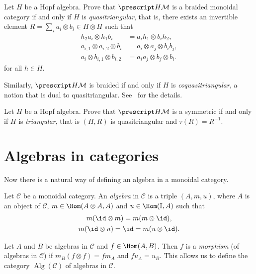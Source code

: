 \begin{exercise}
\label{xca:QT}
    Let $H$ be a Hopf algebra. Prove that 
    $\lmod{H}$ is a braided
    monoidal category if and only if $H$ is \emph{quasitriangular}, that is, there exists an invertible element
    $R=\sum_{i}a_{i}\otimes b_{i}\in H\otimes H$ such that 
\begin{align*}
h_{2}a_{i}\otimes h_{1}b_{i} & =a_{i}h_{1}\otimes b_{i}h_{2},\\
a_{i,1}\otimes a_{i,2}\otimes b_{i} & =a_{i}\otimes a_{j}\otimes b_{i}b_{j},\\
a_{i}\otimes b_{i,1}\otimes b_{i,2} & =a_{i}a_{j}\otimes b_{j}\otimes b_{i}.
\end{align*}
for all $h\in H$. 
\end{exercise} 

Similarly, $\lcomod{H}$ is braided if and only if $H$ is \emph{coquasitriangular}, a notion that is dual to quasitriangular. See~\cite[\S 10.2]{zbMATH00482792} for the details. 

\begin{exercise}
\label{xca:T}
Let $H$ be a Hopf algebra. Prove that 
    $\lmod{H}$ is a symmetric 
    if and only if $H$ is \emph{triangular}, that is 
    $(H,R)$ 
    is quasitriangular 
    and $\tau(R)=R^{-1}$. 
\end{exercise}

\section{Algebras in categories}
Now there is a natural way of defining an algebra in a monoidal category. 

\begin{definition}
Let $\mathcal{C}$ be a monoidal category. An \emph{algebra} in
$\mathcal{C}$ is a triple $(A,m,u)$, where $A$ is an object of
$\mathcal{C}$, $m\in\Hom(A\otimes A,A)$ and $u\in\Hom(\mathbb{I},A)$ such that 
\begin{gather*}
m(\id\otimes m)=m(m\otimes\id),\\
m(\id\otimes u)=\id=m(u\otimes\id).
\end{gather*}
\end{definition}

Let $A$ and $B$ be algebras in $\mathcal{C}$ and $f\in\Hom(A,B)$.
Then $f$ is a \emph{morphism} (of algebras in $\mathcal{C}$)
if $m_{B}(f\otimes f)=fm_{A}$ and $fu_{A}=u_{B}$. This allows
us to define the category $\operatorname{Alg}(\mathcal{C})$
of algebras in $\mathcal{C}$. 

